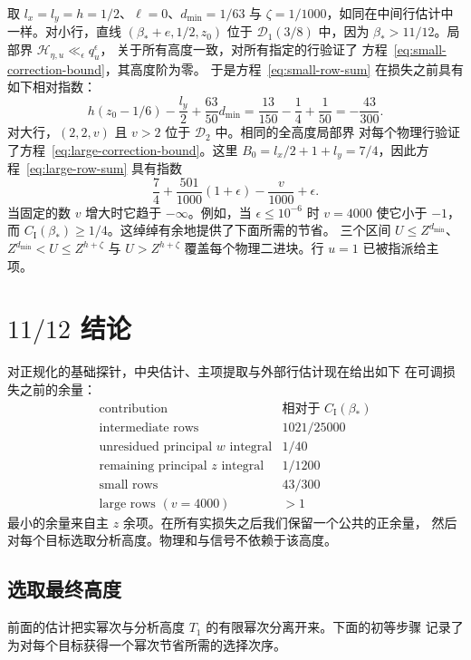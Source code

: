 取 $l_x=l_y=h=1/2$、$\ell=0$、$d_{\min}=1/63$ 与
$\zeta=1/1000$，如同在中间行估计中一样。对小行，直线
$(\beta_*+e,1/2,z_0)$ 位于 $\mathcal D_1(3/8)$ 中，因为
$\beta_*>11/12$。局部界 $\mathcal H_{\eta,u}\ll_\epsilon q_u^\epsilon$，
关于所有高度一致，对所有指定的行验证了
方程~\eqref{eq:small-correction-bound}，其高度阶为零。
于是方程~\eqref{eq:small-row-sum} 在损失之前具有如下相对指数：
\[
 h(z_0-1/6)-\frac{l_y}{2}+\frac{63}{50}d_{\min}
 =\frac{13}{150}-\frac14+\frac1{50}
 =-\frac{43}{300}.
\]
对大行，$(2,2,v)$ 且 $v>2$ 位于 $\mathcal D_2$ 中。相同的全高度局部界
对每个物理行验证了方程~\eqref{eq:large-correction-bound}。这里
$B_0=l_x/2+1+l_y=7/4$，因此方程~\eqref{eq:large-row-sum} 具有指数
\[
 \frac74+\frac{501}{1000}(1+\epsilon)-\frac v{1000}+\epsilon.
\]
当固定的数 $v$ 增大时它趋于 $-\infty$。例如，当
$\epsilon\le10^{-6}$ 时 $v=4000$ 使它小于 $-1$，而
$C_{\mathrm I}(\beta_*)\ge1/4$。这绰绰有余地提供了下面所需的节省。
三个区间 $U\le Z^{d_{\min}}$、$Z^{d_{\min}}<U\le Z^{h+\zeta}$ 与
$U>Z^{h+\zeta}$ 覆盖每个物理二进块。行 $u=1$ 已被指派给主项。

\section{\texorpdfstring{$11/12$}{11/12} 结论}
\label{sec:eleven-twelfths-conclusion}

对正规化的基础探针，中央估计、主项提取与外部行估计现在给出如下
在可调损失之前的余量：
\[
\begin{array}{c|c}
 \text{contribution}&\text{相对于 }C_{\mathrm I}(\beta_*)\\\hline
 \text{intermediate rows}&1021/25000\\
 \text{unresidued principal }w\text{ integral}&1/40\\
 \text{remaining principal }z\text{ integral}&1/1200\\
 \text{small rows}&43/300\\
 \text{large rows }(v=4000)&>1
\end{array}
\]
最小的余量来自主 $z$ 余项。在所有实损失之后我们保留一个公共的正余量，
然后对每个目标选取分析高度。物理和与信号不依赖于该高度。

\subsection{选取最终高度}

前面的估计把实幂次与分析高度 $T_1$ 的有限幂次分离开来。下面的初等步骤
记录了为对每个目标获得一个幂次节省所需的选择次序。

